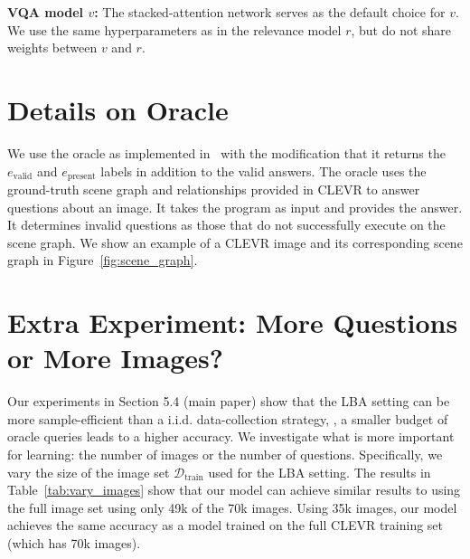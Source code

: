 \documentclass[10pt,twocolumn,letterpaper]{article}
\newcommand{\trainset}{\mathcal{D}_\mathrm{train}}
\newcommand{\fvalidlabel}{e_\mathrm{valid}}
\newcommand{\fpresentlabel}{e_\mathrm{present}}
\begin{document}
\par \noindent \textbf{VQA model $v$:} The stacked-attention network serves as the default choice for $v$. We use the same hyperparameters as in the relevance model $r$, but do not share weights between $v$ and $r$.

\section{Details on Oracle}
We use the oracle as implemented in~\cite{johnson16clevr} with the modification that it returns the $\fvalidlabel$ and $\fpresentlabel$ labels in addition to the valid answers. The oracle uses the ground-truth scene graph and relationships provided in CLEVR to answer questions about an image. It takes the program as input and provides the answer. It determines invalid questions as those that do not successfully execute on the scene graph. We show an example of a CLEVR image and its corresponding scene graph in Figure~\ref{fig:scene_graph}.

\section{Extra Experiment: More Questions or More Images?}
Our experiments in Section 5.4 (main paper) show that the LBA setting can be more sample-efficient than a i.i.d. data-collection strategy, \ie, a smaller budget of oracle queries leads to a higher accuracy. We investigate what is more important for learning: the number of images or the number of questions. Specifically, we vary the size of the image set $\trainset$ used for the LBA setting. The results in Table~\ref{tab:vary_images} show that our model can achieve similar results to using the full image set using only 49k of the 70k images. Using 35k images, our model achieves the same accuracy as a model trained on the full CLEVR training set (which has 70k images).
\end{document}
